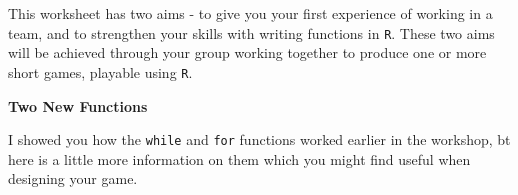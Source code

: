 \documentclass[11pt,a4paper]{article}
\begin{document}

\setcounter{section}{1}

\setcounter{aufg}{0}


This worksheet has two aims - to give you your first experience of working in a team, and to strengthen your skills with writing functions in \texttt{R}. These two aims will be achieved through your group working together to produce one or more short games, playable using \texttt{R}.

\vspace{0.2cm}
\textbf{Two New Functions}
\vspace{0.2cm}

I showed you how the \texttt{while} and \texttt{for} functions worked earlier in the workshop, bt here is a little more information on them which you might find useful when designing your game.
\end{document}
